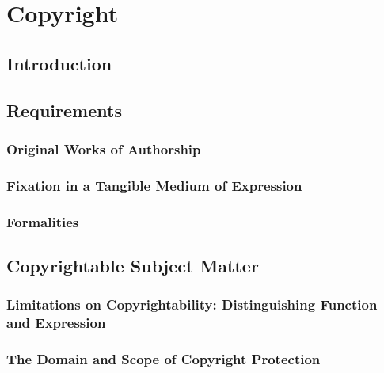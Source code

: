 \section{Copyright}

\subsection{Introduction}



\subsection{Requirements}

\subsubsection{Original Works of Authorship}


\subsubsection{Fixation in a Tangible Medium of Expression}


\subsubsection{Formalities}


\subsection{Copyrightable Subject Matter}


\subsubsection{Limitations on Copyrightability: Distinguishing Function and 
Expression}


\subsubsection{The Domain and Scope of Copyright Protection}

